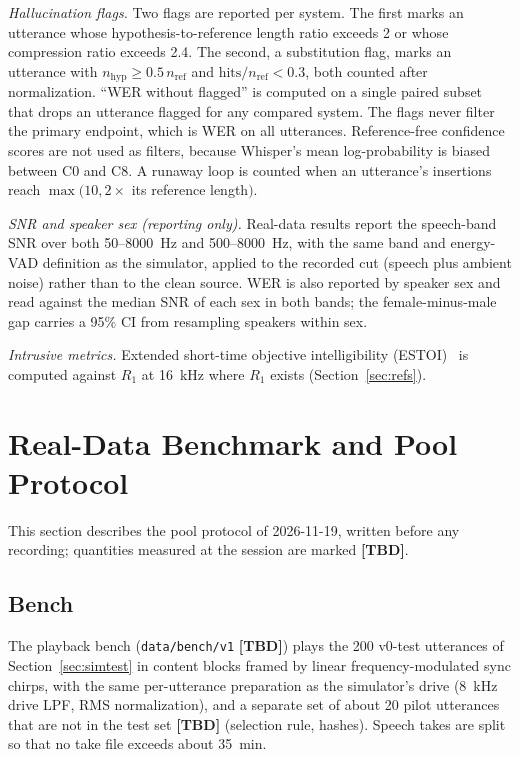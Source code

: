 \documentclass[conference]{IEEEtran}
\newcommand{\tbd}{\textbf{[TBD]}}
\begin{document}
\textit{Hallucination flags.} Two flags are reported per system. The first marks an utterance whose
hypothesis-to-reference length ratio exceeds 2 or whose compression ratio exceeds 2.4. The second, a
substitution flag, marks an utterance with $n_{\mathrm{hyp}} \ge 0.5\,n_{\mathrm{ref}}$ and
$\mathrm{hits}/n_{\mathrm{ref}} < 0.3$, both counted after normalization. ``WER without flagged'' is
computed on a single paired subset that drops an utterance flagged for any compared system. The flags
never filter the primary endpoint, which is WER on all utterances. Reference-free confidence scores are
not used as filters, because Whisper's mean log-probability is biased between C0 and C8. A runaway loop
is counted when an utterance's insertions reach $\max(10, 2\times$ its reference length$)$.

\textit{SNR and speaker sex (reporting only).} Real-data results report the speech-band SNR over both
50--8000~Hz and 500--8000~Hz, with the same band and energy-VAD definition as the simulator, applied
to the recorded cut (speech plus ambient noise) rather than to the clean source. WER is also reported by speaker sex and
read against the median SNR of each sex in both bands; the female-minus-male gap carries a 95\% CI
from resampling speakers within sex.

\textit{Intrusive metrics.} Extended short-time objective intelligibility (ESTOI)~\cite{jensen2016} is
computed against $R_1$ at 16~kHz where $R_1$ exists (Section~\ref{sec:refs}).

\section{Real-Data Benchmark and Pool Protocol}
\label{sec:bench}
This section describes the pool protocol of 2026-11-19, written before any recording; quantities
measured at the session are marked \tbd.

\subsection{Bench}
\label{sec:benchbuild}
The playback bench (\texttt{data/bench/v1} \tbd) plays the 200 v0-test utterances of
Section~\ref{sec:simtest} in content blocks framed by linear frequency-modulated sync chirps, with the
same per-utterance preparation as the simulator's drive (8~kHz drive LPF, RMS normalization), and a
separate set of about 20 pilot utterances that are not in the test set \tbd{} (selection rule,
hashes). Speech takes are split so that no take file exceeds about 35~min.
\end{document}
